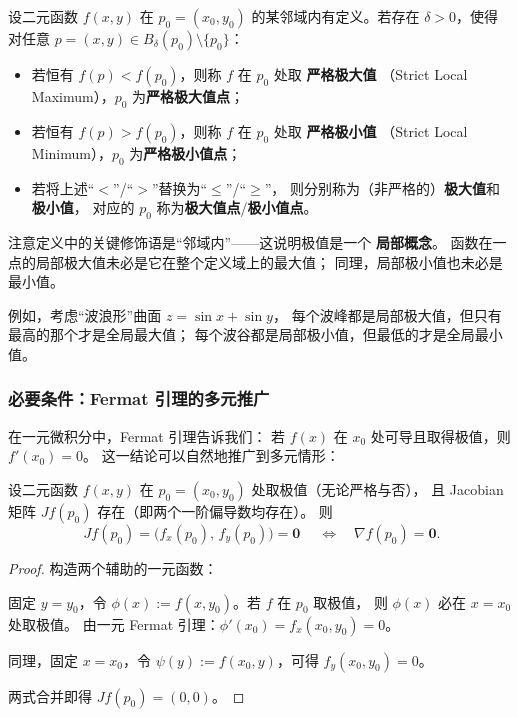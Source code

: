 \documentclass[lang=cn,11pt]{elegantbook}
\begin{document}
\begin{definition} \label{def:extremum}
设二元函数 $f(x,y)$ 在 $p_0=(x_0,y_0)$ 的某邻域内有定义。若存在 $\delta>0$，使得对任意 $p=(x,y)\in B_\delta(p_0)\setminus\{p_0\}$：
\begin{itemize}
  \item 若恒有 $f(p)<f(p_0)$，则称 $f$ 在 $p_0$ 处取 \textbf{严格极大值}
        （Strict Local Maximum），$p_0$ 为\textbf{严格极大值点}；
  \item 若恒有 $f(p)>f(p_0)$，则称 $f$ 在 $p_0$ 处取 \textbf{严格极小值}
        （Strict Local Minimum），$p_0$ 为\textbf{严格极小值点}；
  \item 若将上述“$<$”/“$>$”替换为“$\leq$”/“$\geq$”，
        则分别称为（非严格的）\textbf{极大值}和\textbf{极小值}，
        对应的 $p_0$ 称为\textbf{极大值点}/\textbf{极小值点}。
\end{itemize}
\end{definition}

\begin{note}[局部性与整体性]
注意定义中的关键修饰语是“邻域内”——这说明极值是一个 \textbf{局部概念}。
函数在一点的局部极大值未必是它在整个定义域上的最大值；
同理，局部极小值也未必是最小值。

例如，考虑“波浪形”曲面 $z=\sin x+\sin y$，
每个波峰都是局部极大值，但只有最高的那个才是全局最大值；
每个波谷都是局部极小值，但最低的才是全局最小值。
\end{note}


\subsubsection*{必要条件：Fermat 引理的多元推广}

在一元微积分中，Fermat 引理告诉我们：
若 $f(x)$ 在 $x_0$ 处可导且取得极值，则 $f'(x_0)=0$。
这一结论可以自然地推广到多元情形：

\begin{theorem}[极值的必要条件] \label{thm:necessary-condition-extreme}
设二元函数 $f(x,y)$ 在 $p_0=(x_0,y_0)$ 处取极值（无论严格与否），
且 Jacobian 矩阵 $Jf(p_0)$ 存在（即两个一阶偏导数均存在）。
则
\[
\boxed{\;Jf(p_0)=
\bigl(f_x(p_0),\,f_y(p_0)\bigr)=\boldsymbol 0\;}
\quad\Longleftrightarrow\quad
\nabla f(p_0)=\boldsymbol 0.
\]
\end{theorem}

\begin{proof}
构造两个辅助的一元函数：

固定 $y=y_0$，令 $\phi(x):=f(x,y_0)$。若 $f$ 在 $p_0$ 取极值，
则 $\phi(x)$ 必在 $x=x_0$ 处取极值。
由一元 Fermat 引理：$\phi'(x_0)=f_x(x_0,y_0)=0$。

同理，固定 $x=x_0$，令 $\psi(y):=f(x_0,y)$，可得
$f_y(x_0,y_0)=0$。

两式合并即得 $Jf(p_0)=(0,0)$。
\end{proof}
\end{document}
